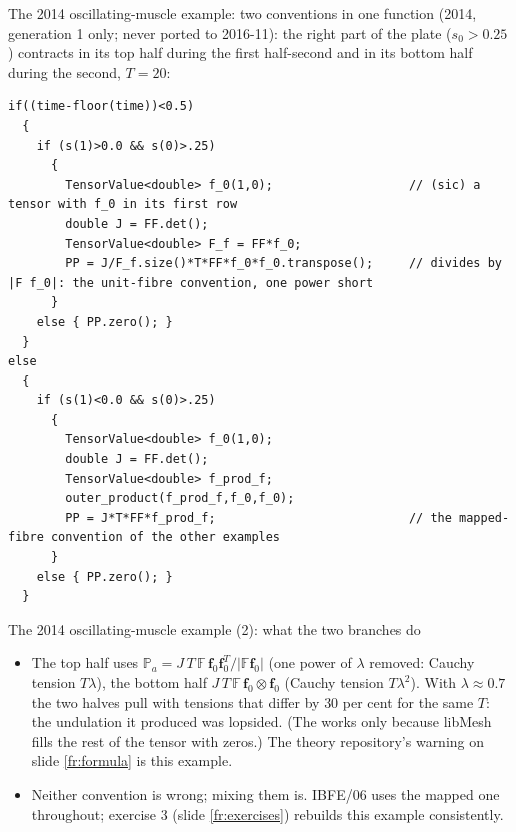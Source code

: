 \documentclass[aspectratio=169,11pt]{beamer}
\begin{document}
\begin{frame}[fragile]{The 2014 oscillating-muscle example: two conventions in one function}
\label{fr:oscillating}
\scriptsize
{} (2014, generation 1 only; never ported to 2016-11): the right part of the plate ($s_0 > 0.25$) contracts in its top half during the first half-second and in its bottom half during the second, $T = 20$:
\begin{lstlisting}[style=cpptiny]
if((time-floor(time))<0.5)
  {
    if (s(1)>0.0 && s(0)>.25)
      {
        TensorValue<double> f_0(1,0);                   // (sic) a tensor with f_0 in its first row
        double J = FF.det();
        TensorValue<double> F_f = FF*f_0;
        PP = J/F_f.size()*T*FF*f_0*f_0.transpose();     // divides by |F f_0|: the unit-fibre convention, one power short
      }
    else { PP.zero(); }
  }
else
  {
    if (s(1)<0.0 && s(0)>.25)
      {
        TensorValue<double> f_0(1,0);
        double J = FF.det();
        TensorValue<double> f_prod_f;
        outer_product(f_prod_f,f_0,f_0);
        PP = J*T*FF*f_prod_f;                           // the mapped-fibre convention of the other examples
      }
    else { PP.zero(); }
  }
\end{lstlisting}
\end{frame}

\begin{frame}{The 2014 oscillating-muscle example (2): what the two branches do}
\label{fr:oscillating2}
\footnotesize
\begin{itemize}
  \item The top half uses $\mathbb{P}_a = J\,T\,\mathbb{F}\,\mathbf{f}_0\mathbf{f}_0^T/|\mathbb{F}\mathbf{f}_0|$ (one power of $\lambda$ removed: Cauchy tension $T\lambda$), the bottom half $J\,T\,\mathbb{F}\,\mathbf{f}_0\otimes\mathbf{f}_0$ (Cauchy tension $T\lambda^2$). With $\lambda \approx 0.7$ the two halves pull with tensions that differ by $30$ per cent for the same $T$: the undulation it produced was lopsided. (The  works only because libMesh fills the rest of the tensor with zeros.) The theory repository's warning on slide \ref{fr:formula} is this example.
  \item Neither convention is wrong; mixing them is. IBFE/06 uses the mapped one throughout; exercise 3 (slide \ref{fr:exercises}) rebuilds this example consistently.
\end{itemize}
\end{frame}
\end{document}
